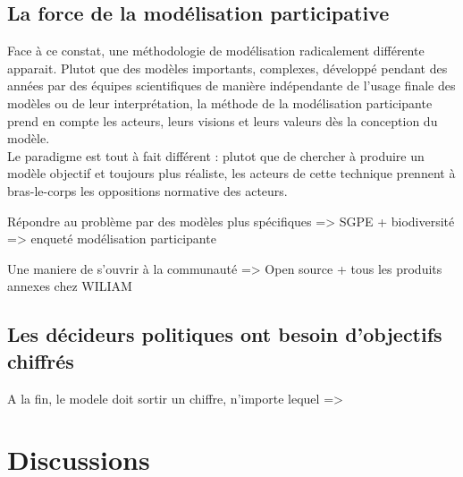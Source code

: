 \subsection{La force de la modélisation participative}

Face à ce constat, une méthodologie de modélisation radicalement différente apparait. Plutot que des modèles importants, complexes, développé pendant des années par des équipes scientifiques de manière indépendante de l'usage finale des modèles ou de leur interprétation, la méthode de la modélisation participante prend en compte les acteurs, leurs visions et leurs valeurs dès la conception du modèle. \\

Le paradigme est tout à fait différent : plutot que de chercher à produire un modèle objectif et toujours plus réaliste, les acteurs de cette technique prennent à bras-le-corps les oppositions normative des acteurs. 

Répondre au problème par des modèles plus spécifiques
=> SGPE + biodiversité
=> enqueté modélisation participante

Une maniere de s'ouvrir à la communauté
=> Open source + tous les produits annexes chez WILIAM

\subsection{Les décideurs politiques ont besoin d'objectifs chiffrés}

A la fin, le modele doit sortir un chiffre, n'importe lequel
=> 


\section{Discussions}








